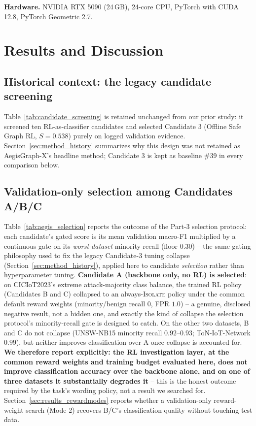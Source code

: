 \documentclass[journal]{IEEEtran}
\begin{document}
\textbf{Hardware.} NVIDIA RTX 5090 (24\,GB), 24-core CPU, PyTorch with CUDA
12.8, PyTorch Geometric 2.7.

\section{Results and Discussion}
\label{sec:results}



\subsection{Historical context: the legacy candidate screening}
Table~\ref{tab:candidate_screening} is retained unchanged from our prior
study: it screened ten RL-as-classifier candidates and selected Candidate 3
(Offline Safe Graph RL, $S{=}0.538$) purely on logged validation evidence.
Section~\ref{sec:method_history} summarizes why this design was not retained
as AegisGraph-X's headline method; Candidate 3 is kept as baseline \#39 in
every comparison below.

\subsection{Validation-only selection among Candidates A/B/C}
\label{sec:results_selection}

Table~\ref{tab:aegis_selection} reports the outcome of the Part-3 selection
protocol: each candidate's gated score is its mean validation macro-F1
multiplied by a continuous gate on its \emph{worst-dataset} minority recall
(floor $0.30$) -- the same gating philosophy used to fix the legacy
Candidate-3 tuning collapse (Section~\ref{sec:method_history}), applied here
to candidate \emph{selection} rather than hyperparameter tuning.
\textbf{Candidate A (backbone only, no RL) is selected}: on CICIoT2023's
extreme attack-majority class balance, the trained RL policy (Candidates B
and C) collapsed to an always-\textsc{Isolate} policy under the common
default reward weights (minority/benign recall $0$, FPR $1.0$) -- a genuine,
disclosed negative result, not a hidden one, and exactly the kind of collapse
the selection protocol's minority-recall gate is designed to catch. On the
other two datasets, B and C do not collapse (UNSW-NB15 minority recall
$0.92$--$0.93$; ToN-IoT-Network $0.99$), but neither improves classification
over A once collapse is accounted for. \textbf{We therefore report explicitly:
the RL investigation layer, at the common reward weights and training budget
evaluated here, does not improve classification accuracy over the backbone
alone, and on one of three datasets it substantially degrades it} -- this is
the honest outcome required by the task's wording policy, not a result we
searched for. Section~\ref{sec:results_rewardmodes} reports whether a
validation-only reward-weight search (Mode 2) recovers B/C's classification
quality without touching test data.
\end{document}
